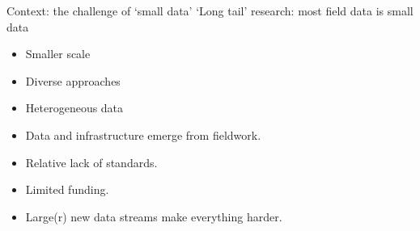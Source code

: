 \documentclass[aspectratio=169, 12pt]{beamer} %
\begin{document}

\begin{frame}{Context: the challenge of `small data'}
    `Long tail' research: most field data is small data \cite{Borgman2015-rh}
    \begin{itemize}[label=\textbullet]
        \item Smaller scale
        \item Diverse approaches
        \item Heterogeneous data
        \item Data and infrastructure emerge from fieldwork. 
        \item Relative lack of standards.
        \item Limited funding.
        \item Large(r) new data streams make everything harder.
    \end{itemize}
\end{frame}
\end{document}
